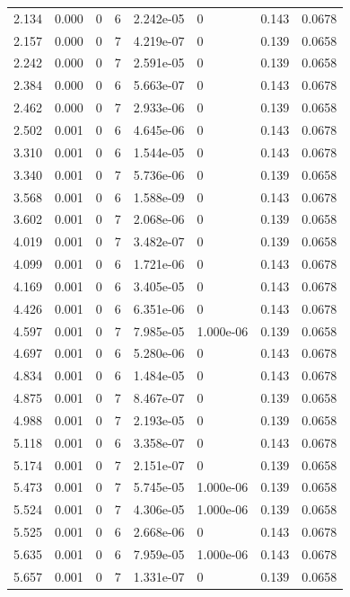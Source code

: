 \documentclass[preview]{standalone}
\begin{document}
{{\begin{tabular}{L{1.2cm}C{1.2cm} C{0.3cm}C{0.5cm} C{1.4cm}C{1.4cm} C{1.4cm}C{1.4cm}}
  2.134  &  0.000  & 0     &  6 &  2.242e-05  & 0  & 0.143 &  0.0678   \\ 
  2.157  &  0.000  & 0     &  7 &  4.219e-07  & 0  & 0.139 &  0.0658   \\ 
  2.242  &  0.000  & 0     &  7 &  2.591e-05  & 0  & 0.139 &  0.0658   \\ 
  2.384  &  0.000  & 0     &  6 &  5.663e-07  & 0  & 0.143 &  0.0678   \\ 
  2.462  &  0.000  & 0     &  7 &  2.933e-06  & 0  & 0.139 &  0.0658   \\ 
  2.502  &  0.001  & 0     &  6 &  4.645e-06  & 0  & 0.143 &  0.0678   \\ 
  3.310  &  0.001  & 0     &  6 &  1.544e-05  & 0  & 0.143 &  0.0678   \\ 
  3.340  &  0.001  & 0     &  7 &  5.736e-06  & 0  & 0.139 &  0.0658   \\ 
  3.568  &  0.001  & 0     &  6 &  1.588e-09  & 0  & 0.143 &  0.0678   \\ 
  3.602  &  0.001  & 0     &  7 &  2.068e-06  & 0  & 0.139 &  0.0658   \\ 
  4.019  &  0.001  & 0     &  7 &  3.482e-07  & 0  & 0.139 &  0.0658   \\ 
  4.099  &  0.001  & 0     &  6 &  1.721e-06  & 0  & 0.143 &  0.0678   \\ 
  4.169  &  0.001  & 0     &  6 &  3.405e-05  & 0  & 0.143 &  0.0678   \\ 
  4.426  &  0.001  & 0     &  6 &  6.351e-06  & 0  & 0.143 &  0.0678   \\ 
  4.597  &  0.001  & 0     &  7 &  7.985e-05  & 1.000e-06  & 0.139 &  0.0658   \\ 
  4.697  &  0.001  & 0     &  6 &  5.280e-06  & 0  & 0.143 &  0.0678   \\ 
  4.834  &  0.001  & 0     &  6 &  1.484e-05  & 0  & 0.143 &  0.0678   \\ 
  4.875  &  0.001  & 0     &  7 &  8.467e-07  & 0  & 0.139 &  0.0658   \\ 
  4.988  &  0.001  & 0     &  7 &  2.193e-05  & 0  & 0.139 &  0.0658   \\ 
  5.118  &  0.001  & 0     &  6 &  3.358e-07  & 0  & 0.143 &  0.0678   \\ 
  5.174  &  0.001  & 0     &  7 &  2.151e-07  & 0  & 0.139 &  0.0658   \\ 
  5.473  &  0.001  & 0     &  7 &  5.745e-05  & 1.000e-06  & 0.139 &  0.0658   \\ 
  5.524  &  0.001  & 0     &  7 &  4.306e-05  & 1.000e-06  & 0.139 &  0.0658   \\ 
  5.525  &  0.001  & 0     &  6 &  2.668e-06  & 0  & 0.143 &  0.0678   \\ 
  5.635  &  0.001  & 0     &  6 &  7.959e-05  & 1.000e-06  & 0.143 &  0.0678   \\ 
  5.657  &  0.001  & 0     &  7 &  1.331e-07  & 0  & 0.139 &  0.0658   \\ 
\hline 
\end{tabular} 

}}
\end{document}
